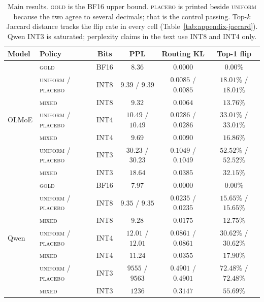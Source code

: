 \documentclass[11pt]{article}
\newcommand{\gold}{\textsc{gold}}
\newcommand{\uniform}{\textsc{uniform}}
\newcommand{\mixed}{\textsc{mixed}}
\newcommand{\placebo}{\textsc{placebo}}
\begin{document}
\begin{table}[t]
\centering
\small
\setlength{\tabcolsep}{4pt}
\begin{tabular}{llcccc}
\toprule
Model & Policy & Bits & PPL & Routing KL & Top-1 flip \\
\midrule
\multirow{7}{*}{OLMoE}
 & \gold{} & BF16 & $8.36$ & $0.0000$ & $0.00\%$ \\
 & \uniform{} / \placebo{} & INT8 & $9.39$ / $9.39$ & $0.0085$ / $0.0085$ & $18.01\%$ / $18.01\%$ \\
 & \mixed{} & INT8 & $9.32$ & $0.0064$ & $13.76\%$ \\
 & \uniform{} / \placebo{} & INT4 & $10.49$ / $10.49$ & $0.0286$ / $0.0286$ & $33.01\%$ / $33.01\%$ \\
 & \mixed{} & INT4 & $9.69$ & $0.0090$ & $16.86\%$ \\
 & \uniform{} / \placebo{} & INT3 & $30.23$ / $30.23$ & $0.1049$ / $0.1049$ & $52.52\%$ / $52.52\%$ \\
 & \mixed{} & INT3 & $18.64$ & $0.0385$ & $32.15\%$ \\
\midrule
\multirow{7}{*}{Qwen}
 & \gold{} & BF16 & $7.97$ & $0.0000$ & $0.00\%$ \\
 & \uniform{} / \placebo{} & INT8 & $9.35$ / $9.35$ & $0.0235$ / $0.0235$ & $15.65\%$ / $15.65\%$ \\
 & \mixed{} & INT8 & $9.28$ & $0.0175$ & $12.75\%$ \\
 & \uniform{} / \placebo{} & INT4 & $12.01$ / $12.01$ & $0.0861$ / $0.0861$ & $30.62\%$ / $30.62\%$ \\
 & \mixed{} & INT4 & $11.24$ & $0.0355$ & $17.90\%$ \\
 & \uniform{} / \placebo{} & INT3 & $9555$ / $9563$ & $0.4901$ / $0.4901$ & $72.48\%$ / $72.48\%$ \\
 & \mixed{} & INT3 & $1236$ & $0.3147$ & $55.69\%$ \\
\bottomrule
\end{tabular}
\caption{Main results. \gold{} is the BF16 upper bound. \placebo{} is
  printed beside \uniform{} because the two agree to several decimals;
  that is the control passing. Top-$k$ Jaccard distance tracks the flip
  rate in every cell (Table~\ref{tab:appendix-jaccard}). Qwen INT3 is
  saturated; perplexity claims in the text use INT8 and INT4 only.}
\label{tab:part1}
\end{table}
\end{document}
